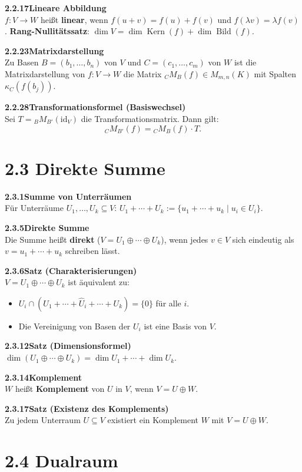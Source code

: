 \documentclass[a4paper,12pt]{article}
\newcommand{\gentry}[3]{%
  \noindent\textbf{#1\quad #2}\nopagebreak\\[0.2em]
  #3\par\smallskip
}
\begin{document}
\gentry{2.2.17}{Lineare Abbildung}{%
  $f: V \to W$ heißt \textbf{linear}, wenn $f(u+v) = f(u)+f(v)$ und $f(\lambda v) = \lambda f(v)$.
  \textbf{Rang-Nullitätssatz}: $\dim V = \dim \operatorname{Kern}(f) + \dim \operatorname{Bild}(f)$.
}

\gentry{2.2.23}{Matrixdarstellung}{%
  Zu Basen $B = (b_1,\ldots,b_n)$ von $V$ und $C = (c_1,\ldots,c_m)$ von $W$ ist die Matrixdarstellung von $f: V \to W$ die Matrix ${}_C M_B(f) \in M_{m,n}(K)$ mit Spalten $\kappa_C(f(b_j))$.
}

\gentry{2.2.28}{Transformationsformel (Basiswechsel)}{%
  Sei $T = {}_B M_{B'}(\mathrm{id}_V)$ die Transformationsmatrix. Dann gilt:
  \[{}_C M_{B'}(f) = {}_C M_B(f) \cdot T.\]
}

\section*{2.3 \quad Direkte Summe}

\gentry{2.3.1}{Summe von Unterräumen}{%
  Für Unterräume $U_1, \ldots, U_k \subseteq V$:
  $U_1 + \cdots + U_k := \{u_1 + \cdots + u_k \mid u_i \in U_i\}$.
}

\gentry{2.3.5}{Direkte Summe}{%
  Die Summe heißt \textbf{direkt} ($V = U_1 \oplus \cdots \oplus U_k$), wenn jedes $v \in V$ sich eindeutig als $v = u_1 + \cdots + u_k$ schreiben lässt.
}

\gentry{2.3.6}{Satz (Charakterisierungen)}{%
  $V = U_1 \oplus \cdots \oplus U_k$ ist äquivalent zu:
  \begin{itemize}[topsep=2pt,itemsep=1pt]
    \item $U_i \cap (U_1 + \cdots + \hat{U}_i + \cdots + U_k) = \{0\}$ für alle $i$.
    \item Die Vereinigung von Basen der $U_i$ ist eine Basis von $V$.
  \end{itemize}
}

\gentry{2.3.12}{Satz (Dimensionsformel)}{%
  $\dim(U_1 \oplus \cdots \oplus U_k) = \dim U_1 + \cdots + \dim U_k$.
}

\gentry{2.3.14}{Komplement}{%
  $W$ heißt \textbf{Komplement} von $U$ in $V$, wenn $V = U \oplus W$.
}

\gentry{2.3.17}{Satz (Existenz des Komplements)}{%
  Zu jedem Unterraum $U \subseteq V$ existiert ein Komplement $W$ mit $V = U \oplus W$.
}

\section*{2.4 \quad Dualraum}
\end{document}
